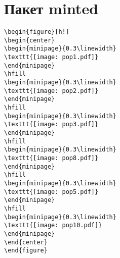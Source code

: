 \documentclass[12pt, a4paper]{article}
\begin{document}
\section{Пакет minted}
\begin{verbatim}
\begin{figure}[h!]
\begin{center}
\begin{minipage}{0.3\linewidth}
\texttt{[image: pop1.pdf]}
\end{minipage}
\hfill
\begin{minipage}{0.3\linewidth}
\texttt{[image: pop2.pdf]}
\end{minipage}
\hfill
\begin{minipage}{0.3\linewidth}
\texttt{[image: pop3.pdf]}
\end{minipage}
\hfill
\begin{minipage}{0.3\linewidth}
\texttt{[image: pop8.pdf]}
\end{minipage}
\hfill
\begin{minipage}{0.3\linewidth}
\texttt{[image: pop5.pdf]}
\end{minipage}
\hfill
\begin{minipage}{0.3\linewidth}
\texttt{[image: pop10.pdf]}
\end{minipage}
\end{center}
\end{figure}
\end{verbatim}
\end{document}
